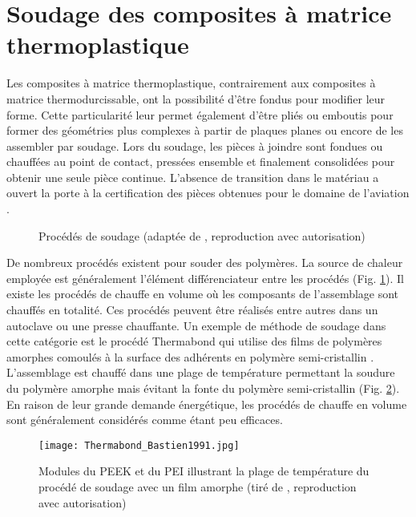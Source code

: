 \section{Soudage des composites à matrice thermoplastique}

Les composites à matrice thermoplastique, contrairement aux composites à matrice thermodurcissable, ont la possibilité d'être fondus pour modifier leur forme. 
Cette particularité leur permet également d'être pliés ou emboutis pour former des géométries plus complexes à partir de plaques planes ou encore de les assembler par soudage. 
Lors du soudage, les pièces à joindre sont fondues ou chauffées au point de contact, pressées ensemble et finalement consolidées pour obtenir une seule pièce continue. 
L'absence de transition dans le matériau a ouvert la porte à la certification des pièces obtenues pour le domaine de l'aviation \cite{Gardiner2018}. 

\begin{figure}[h]
	\centering
	\resizebox{0.75\textwidth}{!}{
	}
	\caption{Procédés de soudage (adaptée de \cite{Ageorges2001a}, reproduction avec autorisation)}
	\label{fig:arbre_procédé_soudage}
\end{figure}

\FloatBarrier
De nombreux procédés existent pour souder des polymères. 
La source de chaleur employée est généralement l'élément différenciateur entre les procédés (Fig. \ref{fig:arbre_procédé_soudage}). 
Il existe les procédés de chauffe en volume où les composants de l'assemblage sont chauffés en totalité. 
Ces procédés peuvent être réalisés entre autres dans un autoclave ou une presse chauffante. 
Un exemple de méthode de soudage dans cette catégorie est le procédé Thermabond qui utilise des films de polymères amorphes comoulés à la surface des adhérents en polymère semi-cristallin \cite{Smiley1991a}. 
L'assemblage est chauffé dans une plage de température permettant la soudure du polymère amorphe mais évitant la fonte du polymère semi-cristallin (Fig. \ref{fig:thermabond_process}). 
En raison de leur grande demande énergétique, les procédés de chauffe en volume sont généralement considérés comme étant peu efficaces. 

\begin{figure}[h]
	\centering
	\texttt{[image: Thermabond\_Bastien1991.jpg]}
	\caption{Modules du PEEK et du PEI illustrant la plage de température du procédé de soudage avec un film amorphe (tiré de \cite{Bastien1991}, reproduction avec autorisation)}
	\label{fig:thermabond_process}
\end{figure}

